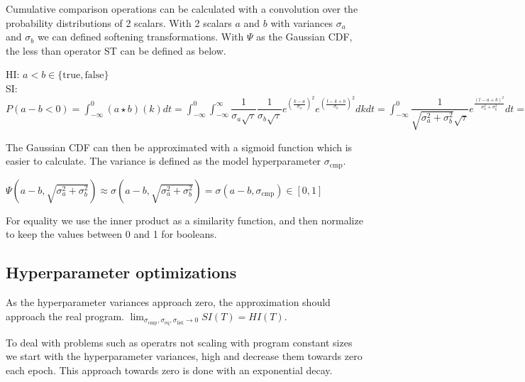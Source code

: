 \documentclass{article}
\begin{document}
Cumulative comparison operations can be calculated with a convolution over the probability distributions of 2 scalars. With 2 scalars $a$ and $b$ with variances $\sigma_a$ and $\sigma_b$ we can defined softening transformations. With $\Psi$ as the Gaussian CDF, the less than operator ST can be defined as below.
\begin{center}
  HI: $a < b \in \{\text{true}, \text{false}\}$\\
  SI: $P(a - b < 0) = \int_{-\infty}^0 (a \star b) (k) dt = \int_{-\infty}^0 \int_{-\infty}^{\infty} \dfrac{1}{\sigma_a \sqrt{\tau}} \dfrac{1}{\sigma_b \sqrt{\tau}} e^{(\frac{k - a}{\sigma_a})^2}e^{(\frac{t-k + b}{\sigma_b})^2} dk dt = \int_{-\infty}^0 \dfrac{1}{\sqrt{\sigma_a^2 + \sigma_b^2} \sqrt{\tau}} e^{\frac{(t - a + b)^2}{\sigma_a^2 + \sigma_b^2}}dt = \Psi(a - b, \sqrt{\sigma_a^2 + \sigma_b^2}) \in [0, 1]$
\end{center}
The Gaussian CDF can then be approximated with a sigmoid function which is easier to calculate. The variance is defined as the model hyperparameter $\sigma_{\text{cmp}}$.
\begin{center}
  $\Psi(a - b, \sqrt{\sigma_a^2 + \sigma_b^2}) \approx \sigma(a - b, \sqrt{\sigma_a^2 + \sigma_b^2}) = \sigma(a - b, \sigma_{\text{cmp}}) \in [0, 1]$
\end{center}

For equality we use the inner product as a similarity function, and then normalize to keep the values between 0 and 1 for booleans.
\begin{center}
  
\end{center}



\subsection*{Hyperparameter optimizations}
As the hyperparameter variances approach zero, the approximation should approach the real program. $\lim_{\sigma_{\text{cmp}}, \sigma_{\text{eq}}, \sigma_{\text{list}} \rightarrow 0} SI(T) = HI(T)$.

To deal with problems such as operatrs not scaling with program constant sizes we start with the hyperparameter variances, high and decrease them towards zero each epoch. This approach towards zero is done with an exponential decay.\\
\end{document}
